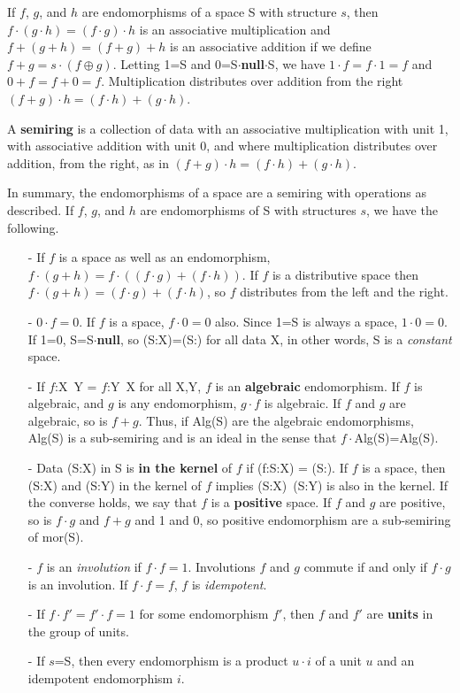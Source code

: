 \documentclass[11pt]{article}
\begin{document}
If $f$, $g$, and $h$ are endomorphisms of a space S with structure $s$, then $f\cdot(g\cdot h)=(f\cdot g)\cdot h$ is an associative 
multiplication and $f+(g+h)=(f+g)+h$ is an associative addition if we define $f+g = s\cdot(f\oplus g)$.  
Letting 1=S and 0=S$\cdot${\bf null}$\cdot$S, we have 
$1\cdot f=f\cdot 1=f$ and $0+f=f+0=f$.  Multiplication distributes over addition from the right $(f+g)\cdot h=(f\cdot h)+(g\cdot h)$.  

\begin{definition}
A {\bf semiring} is a collection of data with an associative multiplication with unit 1, with associative addition with unit 0, and where 
multiplication distributes over addition, from the right, as in $(f+g)\cdot h=(f\cdot h)+(g\cdot h)$.  
\end{definition} 

\noindent In summary, the endomorphisms of a space are a semiring with operations as described.  
If $f$, $g$, and $h$ are endomorphisms of S with structures $s$, we have the following.  
\begin{itemize}
\item[-]{If $f$ is a space as well as an endomorphism, $f\cdot(g+h)=f\cdot((f\cdot g)+(f\cdot h))$.  If 
$f$ is a distributive space then $f\cdot(g+h)=(f\cdot g)+(f\cdot h)$, so $f$ distributes from the left and the right.}
\item[-]{$0\cdot f=0$.  If $f$ is a space, $f\cdot 0=0$ also.  Since 1=S is always a space, $1\cdot 0=0$.  If 1=0, 
S=S$\cdot${\bf null}, so (S:X)=(S:) for all data X, in other words, S is a {\it constant} space.}
\item[-] {If $f$:X\ Y = $f$:Y\ X for all X,Y, $f$ is an {\bf algebraic} endomorphism.  If $f$ is algebraic, and $g$ is any endomorphism,  
$g\cdot f$ is algebraic.  If $f$ and $g$ are algebraic, so is $f+g$.  Thus, if Alg(S) are the algebraic endomorphisms, 
Alg(S) is a sub-semiring and is an ideal in the sense that $f\cdot$Alg(S)=Alg(S).}
\item[-] {Data (S:X) in S is {\bf in the kernel} of $f$ if (f:S:X) = (S:).  If $f$ is a space, then (S:X) and (S:Y) in the kernel of $f$ implies 
(S:X)\ (S:Y) is also in the kernel.  If the converse holds, we say that $f$ is a {\bf positive} space.  If $f$ and $g$ are positive, so is 
$f\cdot g$ and $f+g$ and 1 and 0, so positive endomorphism are a sub-semiring of mor(S).}
\item[-]{$f$ is an {\it involution} if $f\cdot f=1$.  Involutions $f$ and $g$ commute if and only if $f\cdot g$ is an involution.  If $f\cdot f=f$, $f$ is {\it idempotent}.}
\item[-]{If $f\cdot f'=f'\cdot f=1$ for some endomorphism $f'$, then $f$ and $f'$ are {\bf units} in the group of units.}
\item[-]{If $s$=S, then every endomorphism is a product $u\cdot i$ of a unit $u$ and an idempotent endomorphism $i$.} 
 \end{itemize}
\end{document}

